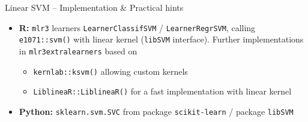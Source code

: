 \begin{frame}{Linear SVM -- Implementation \& Practical hints}
\begin{itemize}
  \item \textbf{R:} \texttt{mlr3} learners \texttt{LearnerClassifSVM} /
  \texttt{LearnerRegrSVM}, calling \texttt{e1071::svm()} with linear kernel (\texttt{libSVM} interface).
  Further implementations in \texttt{mlr3extralearners} based on
  \begin{itemize}
      \item \texttt{kernlab::ksvm()} allowing custom kernels
      \item \texttt{LiblineaR::LiblineaR()} for a fast implementation with linear kernel
  \end{itemize}
  \item \textbf{Python:} \texttt{sklearn.svm.SVC} from package 
  \texttt{scikit-learn} / package \texttt{libSVM}
\end{itemize}

\end{frame}








